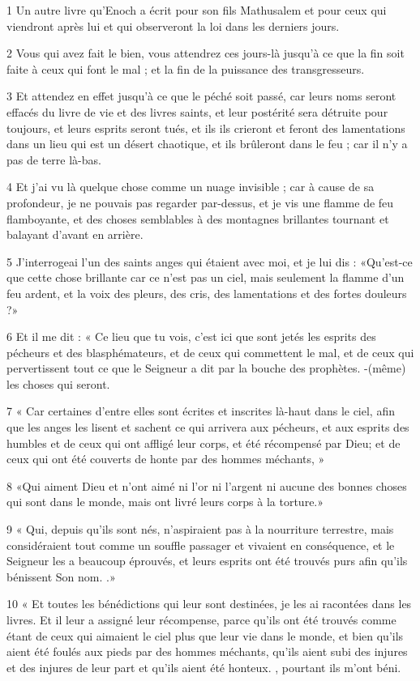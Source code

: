 \par 1 Un autre livre qu'Enoch a écrit pour son fils Mathusalem et pour ceux qui viendront après lui et qui observeront la loi dans les derniers jours.
\par 2 Vous qui avez fait le bien, vous attendrez ces jours-là jusqu'à ce que la fin soit faite à ceux qui font le mal ; et la fin de la puissance des transgresseurs.
\par 3 Et attendez en effet jusqu'à ce que le péché soit passé, car leurs noms seront effacés du livre de vie et des livres saints, et leur postérité sera détruite pour toujours, et leurs esprits seront tués, et ils ils crieront et feront des lamentations dans un lieu qui est un désert chaotique, et ils brûleront dans le feu ; car il n’y a pas de terre là-bas.
\par 4 Et j'ai vu là quelque chose comme un nuage invisible ; car à cause de sa profondeur, je ne pouvais pas regarder par-dessus, et je vis une flamme de feu flamboyante, et des choses semblables à des montagnes brillantes tournant et balayant d'avant en arrière.
\par 5 J'interrogeai l'un des saints anges qui étaient avec moi, et je lui dis : «Qu'est-ce que cette chose brillante car ce n'est pas un ciel, mais seulement la flamme d'un feu ardent, et la voix des pleurs, des cris, des lamentations et des fortes douleurs ?»
\par 6 Et il me dit : « Ce lieu que tu vois, c'est ici que sont jetés les esprits des pécheurs et des blasphémateurs, et de ceux qui commettent le mal, et de ceux qui pervertissent tout ce que le Seigneur a dit par la bouche des prophètes. -(même) les choses qui seront.
\par 7 « Car certaines d'entre elles sont écrites et inscrites là-haut dans le ciel, afin que les anges les lisent et sachent ce qui arrivera aux pécheurs, et aux esprits des humbles et de ceux qui ont affligé leur corps, et été récompensé par Dieu; et de ceux qui ont été couverts de honte par des hommes méchants, »
\par 8 «Qui aiment Dieu et n'ont aimé ni l'or ni l'argent ni aucune des bonnes choses qui sont dans le monde, mais ont livré leurs corps à la torture.»
\par 9 « Qui, depuis qu'ils sont nés, n'aspiraient pas à la nourriture terrestre, mais considéraient tout comme un souffle passager et vivaient en conséquence, et le Seigneur les a beaucoup éprouvés, et leurs esprits ont été trouvés purs afin qu'ils bénissent Son nom. .»
\par 10 « Et toutes les bénédictions qui leur sont destinées, je les ai racontées dans les livres. Et il leur a assigné leur récompense, parce qu'ils ont été trouvés comme étant de ceux qui aimaient le ciel plus que leur vie dans le monde, et bien qu'ils aient été foulés aux pieds par des hommes méchants, qu'ils aient subi des injures et des injures de leur part et qu'ils aient été honteux. , pourtant ils m’ont béni.
